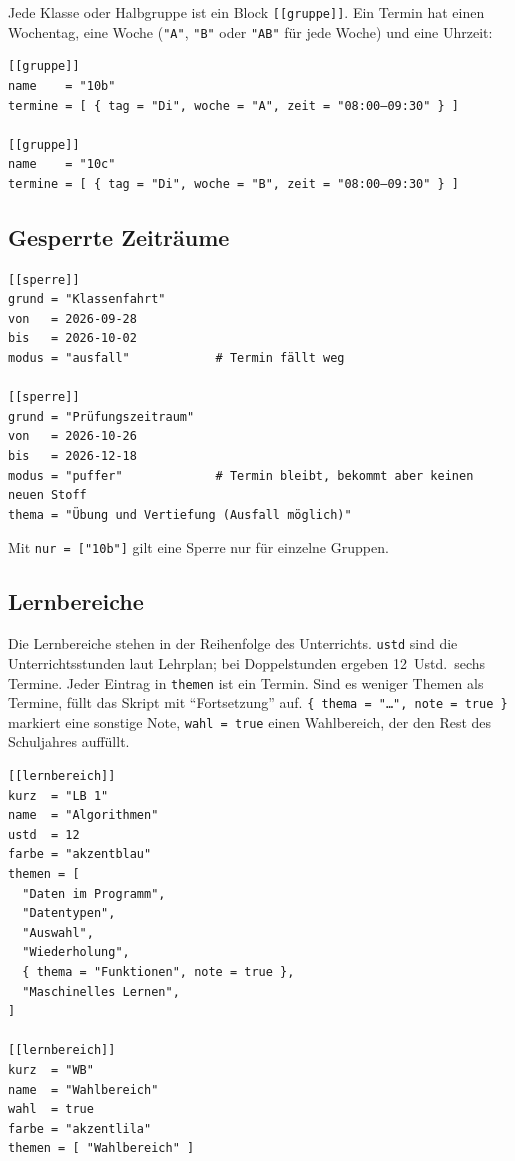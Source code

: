 Jede Klasse oder Halbgruppe ist ein Block \texttt{[[gruppe]]}. Ein Termin hat einen Wochentag, eine Woche (\texttt{"A"}, \texttt{"B"} oder \texttt{"AB"} für jede Woche) und eine Uhrzeit:

\begin{lstlisting}[style=latex]
[[gruppe]]
name    = "10b"
termine = [ { tag = "Di", woche = "A", zeit = "08:00–09:30" } ]

[[gruppe]]
name    = "10c"
termine = [ { tag = "Di", woche = "B", zeit = "08:00–09:30" } ]
\end{lstlisting}


\subsection{Gesperrte Zeiträume}

\begin{lstlisting}[style=latex]
[[sperre]]
grund = "Klassenfahrt"
von   = 2026-09-28
bis   = 2026-10-02
modus = "ausfall"            # Termin fällt weg

[[sperre]]
grund = "Prüfungszeitraum"
von   = 2026-10-26
bis   = 2026-12-18
modus = "puffer"             # Termin bleibt, bekommt aber keinen neuen Stoff
thema = "Übung und Vertiefung (Ausfall möglich)"
\end{lstlisting}

Mit \texttt{nur = ["10b"]} gilt eine Sperre nur für einzelne Gruppen.


\subsection{Lernbereiche}

Die Lernbereiche stehen in der Reihenfolge des Unterrichts. \texttt{ustd} sind die Unterrichtsstunden laut Lehrplan; bei Doppelstunden ergeben 12~Ustd.\ sechs Termine. Jeder Eintrag in \texttt{themen} ist ein Termin. Sind es weniger Themen als Termine, füllt das Skript mit \enquote{Fortsetzung} auf. \texttt{\{ thema = "\dots", note = true \}} markiert eine sonstige Note, \texttt{wahl = true} einen Wahlbereich, der den Rest des Schuljahres auffüllt.

\begin{lstlisting}[style=latex]
[[lernbereich]]
kurz  = "LB 1"
name  = "Algorithmen"
ustd  = 12
farbe = "akzentblau"
themen = [
  "Daten im Programm",
  "Datentypen",
  "Auswahl",
  "Wiederholung",
  { thema = "Funktionen", note = true },
  "Maschinelles Lernen",
]

[[lernbereich]]
kurz  = "WB"
name  = "Wahlbereich"
wahl  = true
farbe = "akzentlila"
themen = [ "Wahlbereich" ]
\end{lstlisting}

